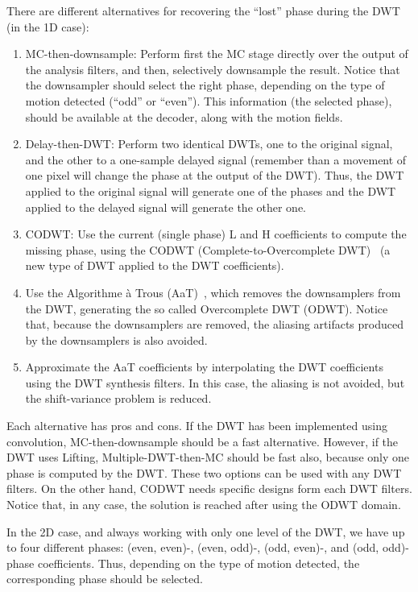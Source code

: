 There are different alternatives for recovering the ``lost'' phase
during the DWT (in the 1D case):
\begin{enumerate}
\item MC-then-downsample: Perform first the MC stage directly over the
  output of the analysis filters, and then, selectively downsample the
  result. Notice that the downsampler should select the right phase,
  depending on the type of motion detected (``odd'' or ``even''). This
  information (the selected phase), should be available at the
  decoder, along with the motion fields.
\item Delay-then-DWT: Perform two identical DWTs, one to the original
  signal, and the other to a one-sample delayed signal (remember than
  a movement of one pixel will change the phase at the output of the
  DWT). Thus, the DWT applied to the original signal will generate
  one of the phases and the DWT applied to the delayed signal will
  generate the other one.
\item CODWT: Use the current (single phase) L and H coefficients to
  compute the missing phase, using the CODWT (Complete-to-Overcomplete
  DWT)~\cite{andreopoulos2005complete} (a new type of DWT applied to
  the DWT coefficients).
\item Use the Algorithme \`a Trous (AaT)~\cite{mallat1999wavelet},
  which removes the downsamplers from the DWT, generating the so
  called Overcomplete DWT (ODWT). Notice that, because the
  downsamplers are removed, the aliasing artifacts produced by the
  downsamplers is also avoided.
\item Approximate the AaT coefficients by interpolating the DWT
  coefficients using the DWT synthesis filters. In this case, the
  aliasing is not avoided, but the shift-variance problem is
  reduced.
\end{enumerate}
Each alternative has pros and cons. If the DWT has been implemented
using convolution, MC-then-downsample should be a fast
alternative. However, if the DWT uses Lifting, Multiple-DWT-then-MC
should be fast also, because only one phase is computed by the
DWT. These two options can be used with any DWT filters. On the other
hand, CODWT needs specific designs form each DWT filters. Notice that,
in any case, the solution is reached after using the ODWT domain.

In the 2D case, and always working with only one level of the DWT, we
have up to four different phases: (even, even)-, (even, odd)-, (odd,
even)-, and (odd, odd)-phase coefficients. Thus, depending on the type
of motion detected, the corresponding phase should be selected.

